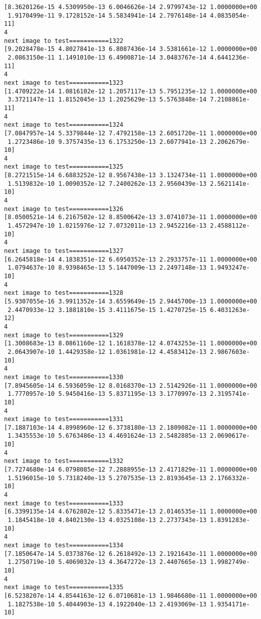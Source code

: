 \documentclass[11pt]{article}
\begin{document}
\begin{Verbatim}[commandchars=\\\{\}]
[8.3620126e-15 4.5309950e-13 6.0046626e-14 2.9799743e-12 1.0000000e+00
 1.9170499e-11 9.1728152e-14 5.5834941e-14 2.7976148e-14 4.0835054e-11]
4
next image to test===========1322
[9.2028478e-15 4.8027841e-13 6.8087436e-14 3.5381661e-12 1.0000000e+00
 2.0863150e-11 1.1491010e-13 6.4900871e-14 3.0483767e-14 4.6441236e-11]
4
next image to test===========1323
[1.4709222e-14 1.0816102e-12 1.2057117e-13 5.7951235e-12 1.0000000e+00
 3.3721147e-11 1.8152045e-13 1.2025629e-13 5.5763848e-14 7.2108861e-11]
4
next image to test===========1324
[7.0847957e-14 5.3379844e-12 7.4792158e-13 2.6051720e-11 1.0000000e+00
 1.2723486e-10 9.3757435e-13 6.1753250e-13 2.6077941e-13 2.2062679e-10]
4
next image to test===========1325
[8.2721515e-14 6.6883252e-12 8.9567438e-13 3.1324734e-11 1.0000000e+00
 1.5139832e-10 1.0090352e-12 7.2400262e-13 2.9560439e-13 2.5621141e-10]
4
next image to test===========1326
[8.0500521e-14 6.2167502e-12 8.8500642e-13 3.0741073e-11 1.0000000e+00
 1.4572947e-10 1.0215976e-12 7.0732011e-13 2.9452216e-13 2.4588112e-10]
4
next image to test===========1327
[6.2645818e-14 4.1838351e-12 6.6950352e-13 2.2933757e-11 1.0000000e+00
 1.0794637e-10 8.9398465e-13 5.1447009e-13 2.2497148e-13 1.9493247e-10]
4
next image to test===========1328
[5.9307055e-16 3.9911352e-14 3.6559649e-15 2.9445700e-13 1.0000000e+00
 2.4470933e-12 3.1881810e-15 3.4111675e-15 1.4270725e-15 6.4031263e-12]
4
next image to test===========1329
[1.3008683e-13 8.0861160e-12 1.1618378e-12 4.0743253e-11 1.0000000e+00
 2.0643907e-10 1.4429358e-12 1.0361981e-12 4.4583412e-13 2.9867603e-10]
4
next image to test===========1330
[7.8945605e-14 6.5936059e-12 8.0168370e-13 2.5142926e-11 1.0000000e+00
 1.7770957e-10 5.9450416e-13 5.8371195e-13 3.1770997e-13 2.3195741e-10]
4
next image to test===========1331
[7.1887103e-14 4.8998960e-12 6.3738180e-13 2.1809082e-11 1.0000000e+00
 1.3435553e-10 5.6763486e-13 4.4691624e-13 2.5482885e-13 2.0690617e-10]
4
next image to test===========1332
[7.7274680e-14 6.0798085e-12 7.2888955e-13 2.4171829e-11 1.0000000e+00
 1.5196015e-10 5.7318240e-13 5.2707535e-13 2.8193645e-13 2.1766332e-10]
4
next image to test===========1333
[6.3399135e-14 4.6762802e-12 5.8335471e-13 2.0146535e-11 1.0000000e+00
 1.1845418e-10 4.8402130e-13 4.0325108e-13 2.2737343e-13 1.8391283e-10]
4
next image to test===========1334
[7.1850647e-14 5.0373876e-12 6.2618492e-13 2.1921643e-11 1.0000000e+00
 1.2750719e-10 5.4069032e-13 4.3647272e-13 2.4407665e-13 1.9982749e-10]
4
next image to test===========1335
[6.5238207e-14 4.8544163e-12 6.0710681e-13 1.9846680e-11 1.0000000e+00
 1.1827538e-10 5.4044903e-13 4.1922040e-13 2.4193069e-13 1.9354171e-10]

\end{Verbatim}
\end{document}
